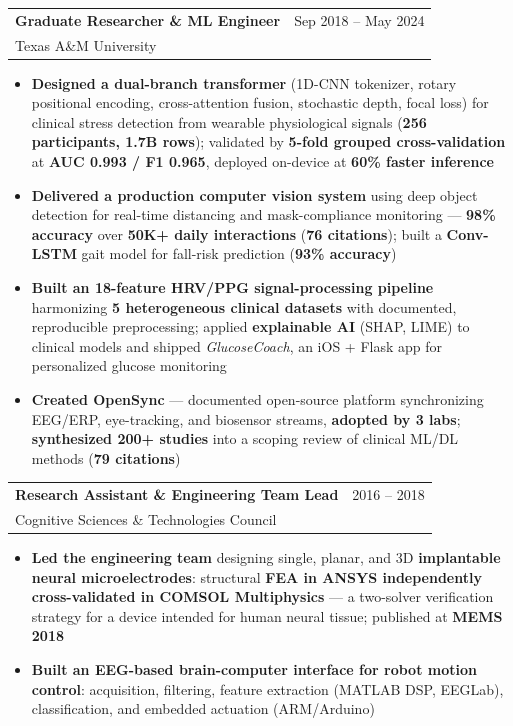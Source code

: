 \documentclass[10.5pt,letterpaper]{article}
\makeatletter
\newcommand{\cventry}[5]{%
  \noindent\begin{tabularx}{\textwidth}{@{}X r@{}}
    {\bfseries\color{headerblue}#2} & {\color{graytext}#1} \\
    {\color{accentcolor}#3}\enskip{\color{lightgray}#4} & \\
  \end{tabularx}%
  \vspace{0.02em}%
  #5%
  \vspace{0.05em}%
}
\makeatother
\begin{document}
\cventry{Sep 2018 -- May 2024}{Graduate Researcher \& ML Engineer \enspace{\color{graytext}\normalsize(Clinical AI, Image Processing, Biosignals)}}{Texas A\&M University}{College Station, TX}{
\begin{itemize}[leftmargin=0.4cm, itemsep=0.02cm, topsep=0.04cm, label={\color{goldaccent}\textbullet}]
  \item \textbf{Designed a dual-branch transformer} (1D-CNN tokenizer, rotary positional encoding, cross-attention fusion, stochastic depth, focal loss) for clinical stress detection from wearable physiological signals (\textbf{256 participants, 1.7B rows}); validated by \textbf{5-fold grouped cross-validation} at \textbf{AUC 0.993 / F1 0.965}, deployed on-device at \textbf{60\% faster inference}
  \item \textbf{Delivered a production computer vision system} using deep object detection for real-time distancing and mask-compliance monitoring --- \textbf{98\% accuracy} over \textbf{50K+ daily interactions} (\textbf{76 citations}); built a \textbf{Conv-LSTM} gait model for fall-risk prediction (\textbf{93\% accuracy})
  \item \textbf{Built an 18-feature HRV/PPG signal-processing pipeline} harmonizing \textbf{5 heterogeneous clinical datasets} with documented, reproducible preprocessing; applied \textbf{explainable AI} (SHAP, LIME) to clinical models and shipped \textit{GlucoseCoach}, an iOS + Flask app for personalized glucose monitoring
  \item \textbf{Created OpenSync} --- documented open-source platform synchronizing EEG/ERP, eye-tracking, and biosensor streams, \textbf{adopted by 3 labs}; \textbf{synthesized 200+ studies} into a scoping review of clinical ML/DL methods (\textbf{79 citations})
\end{itemize}
}

\cventry{2016 -- 2018}{Research Assistant \& Engineering Team Lead \enspace{\color{graytext}\normalsize(Implantable MEMS Neural Microelectrodes)}}{Cognitive Sciences \& Technologies Council}{Tehran, Iran}{
\begin{itemize}[leftmargin=0.4cm, itemsep=0.02cm, topsep=0.04cm, label={\color{goldaccent}\textbullet}]
  \item \textbf{Led the engineering team} designing single, planar, and 3D \textbf{implantable neural microelectrodes}: structural \textbf{FEA in ANSYS independently cross-validated in COMSOL Multiphysics} --- a two-solver verification strategy for a device intended for human neural tissue; published at \textbf{MEMS 2018}
  \item \textbf{Built an EEG-based brain-computer interface for robot motion control}: acquisition, filtering, feature extraction (\mbox{MATLAB} DSP, EEGLab), classification, and embedded actuation (ARM/Arduino)
\end{itemize}
}
\end{document}
